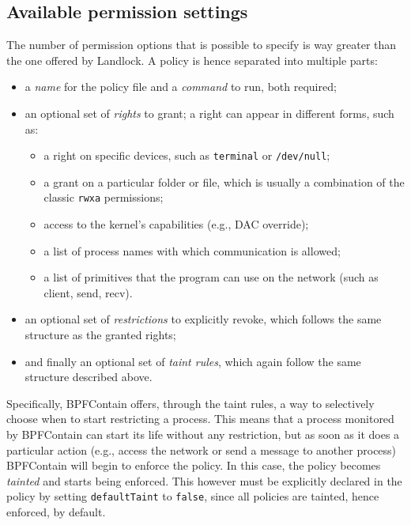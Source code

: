 \subsection{Available permission settings}

The number of permission options that is possible to specify is way greater than the one offered by Landlock.
A policy is hence separated into multiple parts:
\begin{itemize}
  \item a \textit{name} for the policy file and a \textit{command} to run, both required;
  \item an optional set of \textit{rights} to grant; a right can appear in different forms, such as:
        \begin{itemize}
          \item a right on specific devices, such as \texttt{terminal} or \texttt{/dev/null};
          \item a grant on a particular folder or file, which is usually a combination of the classic \texttt{rwxa} permissions;
          \item access to the kernel's capabilities (e.g., DAC override);
          \item a list of process names with which communication is allowed;
          \item a list of primitives that the program can use on the network (such as client, send, recv).
        \end{itemize}
  \item an optional set of \textit{restrictions} to explicitly revoke, which follows the same structure as the
        granted rights;
  \item and finally an optional set of \textit{taint rules}, which again follow the same structure described above.
\end{itemize}

Specifically, BPFContain offers, through the taint rules, a way to selectively choose when
to start restricting a process.
This means that a process monitored by BPFContain can start its life without any restriction,
but as soon as it does a particular action (e.g., access the network or send a message to another process)
BPFContain will begin to enforce the policy.
In this case, the policy becomes \textit{tainted} and starts being enforced.
This however must be explicitly declared in the policy by setting \texttt{defaultTaint} to \texttt{false},
since all policies are tainted, hence enforced, by default.

